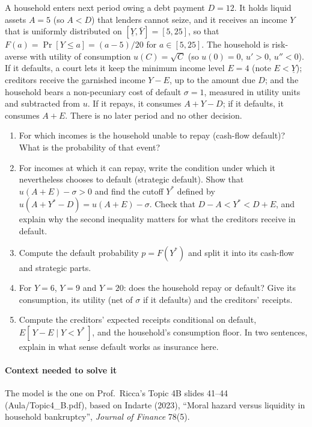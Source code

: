 \documentclass[11pt,a4paper]{article}
\begin{document}
A household enters next period owing a debt payment \(D = 12\). It holds liquid assets \(A = 5\) (so
\(A < D\)) that lenders cannot seize, and it receives an income \(Y\) that is uniformly distributed
on \([\underline Y, \bar Y] = [5, 25]\), so that \(F(a) = \Pr[Y \le a] = (a - 5)/20\) for
\(a \in [5, 25]\). The household is risk-averse with utility of consumption \(u(C) = \sqrt{C}\) (so
\(u(0) = 0\), \(u' > 0\), \(u'' < 0\)). If it defaults, a court lets it keep the minimum income
level \(E = 4\) (note \(E < \underline Y\)); creditors receive the garnished income \(Y - E\), up to
the amount due \(D\); and the household bears a non-pecuniary cost of default \(\sigma = 1\),
measured in utility units and subtracted from \(u\). If it repays, it consumes \(A + Y - D\); if it
defaults, it consumes \(A + E\). There is no later period and no other decision.

\begin{enumerate}
\def\labelenumi{(\alph{enumi})}
\item
  For which incomes is the household unable to repay (cash-flow default)? What is the probability of
  that event?
\item
  For incomes at which it can repay, write the condition under which it nevertheless chooses to
  default (strategic default). Show that \(u(A + E) - \sigma > 0\) and find the cutoff \(Y^*\)
  defined by \(u(A + Y^* - D) = u(A + E) - \sigma\). Check that \(D - A < Y^* < D + E\), and explain
  why the second inequality matters for what the creditors receive in default.
\item
  Compute the default probability \(p = F(Y^*)\) and split it into its cash-flow and strategic
  parts.
\item
  For \(Y = 6\), \(Y = 9\) and \(Y = 20\): does the household repay or default? Give its
  consumption, its utility (net of \(\sigma\) if it defaults) and the creditors' receipts.
\item
  Compute the creditors' expected receipts conditional on default, \(E[\,Y - E \mid Y < Y^*\,]\),
  and the household's consumption floor. In two sentences, explain in what sense default works as
  insurance here.
\end{enumerate}

\paragraph{Context needed to solve it}

The model is the one on Prof.~Ricca's Topic 4B slides 41--44 (Aula/Topic4\_B.pdf), based on Indarte
(2023), ``Moral hazard versus liquidity in household bankruptcy'', \emph{Journal of Finance} 78(5).
\end{document}
